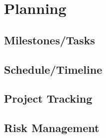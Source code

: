 \section{Planning}

\subsection{Milestones/Tasks}


\subsection{Schedule/Timeline}
\subsection{Project Tracking}
\subsection{Risk Management}